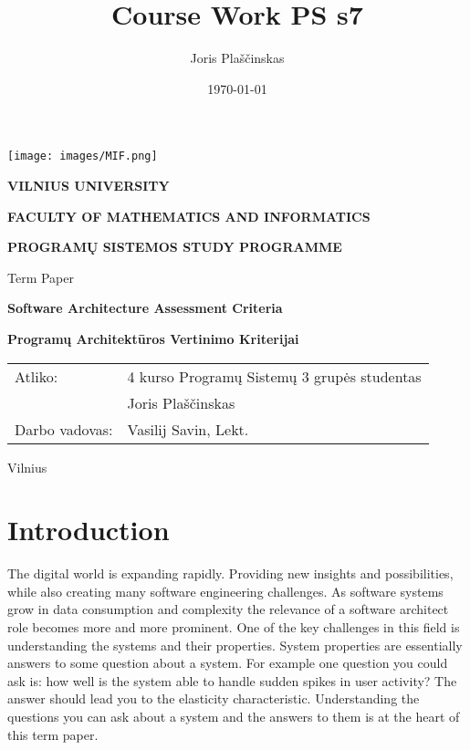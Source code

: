 \documentclass[12pt]{article}
\title{Course Work PS s7}
\author{Joris Plaščinskas}
\date{\today}
\begin{document}
\begin{center} %
\thispagestyle{empty} %
\texttt{[image: images/MIF.png]}
\end{center}
\vskip 20pt
\centerline{\bf \large \textbf{VILNIUS UNIVERSITY}}
\vskip 10pt
\centerline{\large \textbf{FACULTY OF MATHEMATICS AND INFORMATICS}}
\vskip 10pt
\centerline{\large \textbf{\MakeUppercase{Programų Sistemos \space study programme}}}

\vskip 80pt
\centerline{\Large Term Paper}
\vskip 20pt
\begin{center}{\bf \LARGE Software Architecture Assessment Criteria}
\end{center}
\begin{center}{\bf \Large Programų Architektūros Vertinimo Kriterijai}
\end{center}
\vskip 80pt

\begin{table}[h!]
    \centering
    \begin{tabular}{l l}
    Atliko: & 4 kurso Programų Sistemų 3 grupės studentas \\ 
            & Joris Plaščinskas \\
    Darbo vadovas: & Vasilij Savin, Lekt. \\
    \end{tabular}
\end{table}

\vfill
\centerline{Vilnius\textendash\the\year{}}
\newpage %


\tableofcontents %
\thispagestyle{fancy} %
\newpage %


\section*{Introduction} %
The digital world is expanding rapidly. Providing new insights and possibilities, while also creating many software engineering challenges. As software systems grow in data consumption and complexity the relevance of a software architect role becomes more and more prominent. One of the key challenges in this field is understanding the systems and their properties. System properties are essentially answers to some question about a system. For example one question you could ask is: how well is the system able to handle sudden spikes in user activity? The answer should lead you to the elasticity characteristic. Understanding the questions you can ask about a system and the answers to them is at the heart of this term paper.
\end{document}

